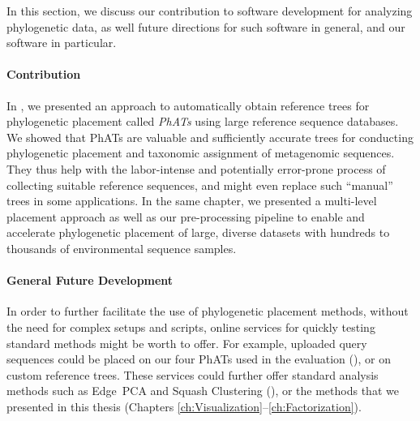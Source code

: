 In this section, we discuss our contribution to software development for analyzing phylogenetic data,
as well future directions for such software in general, and our software in particular.

\paragraph{Contribution}
\label{ch:ConclusionOutlook:sec:UsabilityScalability:par:Contribution}

In , we presented an approach to automatically obtain
reference trees for phylogenetic placement called \emph{\acfp{PhAT}} using large reference sequence databases.
We showed that \acp{PhAT} are valuable and sufficiently accurate trees for
conducting phylogenetic placement and taxonomic assignment of metagenomic sequences.
They thus help with the labor-intense and potentially error-prone process of collecting suitable reference sequences,
and might even replace such ``manual'' trees in some applications.
In the same chapter, we presented a multi-level placement approach as well as our pre-processing pipeline
to enable and accelerate phylogenetic placement
of large, diverse datasets with hundreds to thousands of environmental sequence samples.

\paragraph{General Future Development}
\label{ch:ConclusionOutlook:sec:UsabilityScalability:par:FutureDevelopment}

In order to further facilitate the use of phylogenetic placement methods,
without the need for complex setups and scripts, online services for quickly testing standard methods might be worth to offer.
For example, uploaded query sequences could be placed on our four \acp{PhAT} used in the evaluation
(),
or on custom reference trees.
These services could further offer standard analysis methods such as Edge~PCA and Squash Clustering
(),
or the methods that we presented in this thesis (Chapters \ref{ch:Visualization}--\ref{ch:Factorization}).

